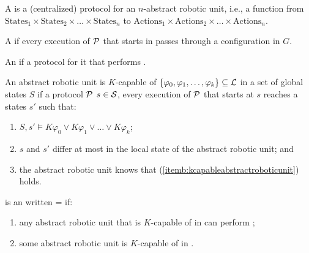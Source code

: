 \begin{defi}
A  is a (centralized) protocol for an $n$-abstract robotic unit, i.e., a function from $\mbox{States}_1\times\mbox{States}_2\times\ldots\times\mbox{States}_n$ to $\mbox{Actions}_1\times\mbox{Actions}_2\times\ldots\times\mbox{Actions}_n$.
\cite{conf/ijcai/BrafmanS95}
\end{defi}

\begin{defi}
A  if every execution of $\mathcal{P}$ that starts in  passes through a configuration in $G$.
\cite{conf/ijcai/BrafmanS95}
\end{defi}

\begin{defi}
An  if \tiTx{} a protocol for it that performs .
\cite{conf/ijcai/BrafmanS95}
\end{defi}

\begin{defi}
An abstract robotic unit is $K$-capable of $\left\{ \varphi_0,\varphi_1,\ldots,\varphi_k\right\}\subseteq\mathcal{L}$ in a set of global states $S$ if \teTx{} a protocol $\mathcal{P}$ \stTx{} \feTx{} $s\in\mathcal{S}$, every execution of $\mathcal{P}$ that starts at $s$ reaches a states $s'$ such that:
\begin{enumerate}
 \item $S,s'\vDash K\varphi_0\vee K\varphi_1\vee\ldots\vee K\varphi_k$;
 \item\label{itemb:kcapableabstractroboticunit} $s$ and $s'$ differ at most in the local state of the abstract robotic unit; and
 \item the abstract robotic unit knows that (\ref{itemb:kcapableabstractroboticunit}) holds.
\end{enumerate}
\cite{conf/ijcai/BrafmanS95}
\end{defi}

\begin{defi}
 is an   written = if:
\begin{enumerate}
 \item any abstract robotic unit that is $K$-capable of  in  can perform ;
 \item some abstract robotic unit is $K$-capable of  in .
\end{enumerate}
\cite{conf/ijcai/BrafmanS95}
\end{defi}

